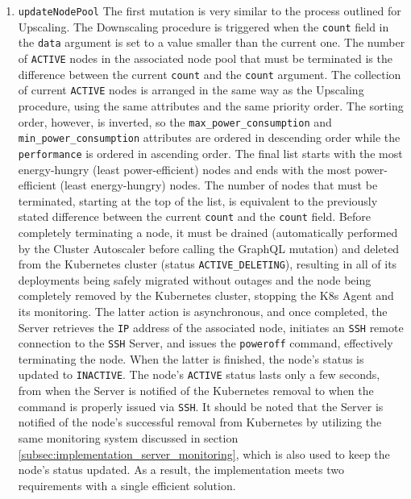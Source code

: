 \begin{enumerate}
  \item \texttt{updateNodePool}
    \newline
    The first mutation is very similar to the process outlined for Upscaling. The
    Downscaling procedure is triggered when the \texttt{count} field in the
    \texttt{data} argument is set to a value smaller than the current one. The
    number of \texttt{ACTIVE} nodes in the associated node pool that must be terminated
    is the difference between the current \texttt{count} and the \texttt{count} argument.
    The collection of current \texttt{ACTIVE} nodes is arranged in the same way as
    the Upscaling procedure, using the same attributes and the same priority
    order. The sorting order, however, is inverted, so the \texttt{max\_power\_consumption}
    and \texttt{min\_power\_consumption} attributes are ordered in descending
    order while the \texttt{performance} is ordered in ascending order. The
    final list starts with the most energy-hungry (least power-efficient) nodes
    and ends with the most power-efficient (least energy-hungry) nodes. The number
    of nodes that must be terminated, starting at the top of the list, is equivalent
    to the previously stated difference between the current \texttt{count} and
    the \texttt{count} field.
    \newline
    Before completely terminating a node, it must be drained (automatically
    performed by the Cluster Autoscaler before calling the GraphQL mutation) and
    deleted from the Kubernetes cluster (status \texttt{ACTIVE\_DELETING}), resulting
    in all of its deployments being safely migrated without outages and the node
    being completely removed by the Kubernetes cluster, stopping the K8s Agent
    and its monitoring. The latter action is asynchronous, and once completed, the
    Server retrieves the \texttt{IP} address of the associated node, initiates an
    \texttt{SSH} remote connection to the \texttt{SSH} Server, and issues the
    \texttt{poweroff} command, effectively terminating the node. When the latter
    is finished, the node's status is updated to \texttt{INACTIVE}. The node's
    \texttt{ACTIVE} status lasts only a few seconds, from when the Server is
    notified of the Kubernetes removal to when the command is properly issued
    via \texttt{SSH}.
    \newline
    It should be noted that the Server is notified of the node's successful
    removal from Kubernetes by utilizing the same monitoring system discussed in
    section \ref{subsec:implementation_server_monitoring}, which is also used to
    keep the node's status updated. As a result, the implementation meets two requirements
    with a single efficient solution.


\end{enumerate}

